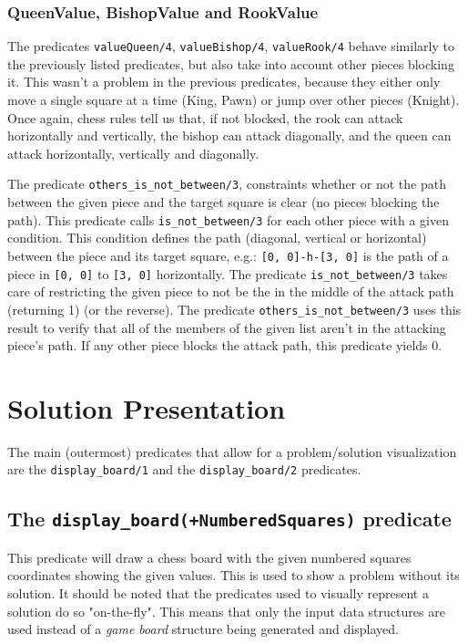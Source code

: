 \documentclass[runningheads]{llncs}
\newcommand{\inlinecode}[1]{\texttt{#1}}
\begin{document}
\subsubsection{QueenValue, BishopValue and RookValue}
The predicates \inlinecode{valueQueen/4}, \inlinecode{valueBishop/4}, \inlinecode{valueRook/4}
behave similarly to the previously listed predicates, but also take into account
other pieces blocking it. This wasn't a problem in the previous predicates, because
they either only move a single square at a time (King, Pawn) or jump over other pieces
(Knight). Once again, chess rules tell us that, if not blocked, the rook can attack
horizontally and vertically, the bishop can attack diagonally, and the queen can attack
horizontally, vertically and diagonally.

The predicate \inlinecode{others\_is\_not\_between/3}, constraints whether or not the
path between the given piece and the target square is clear (no pieces blocking the path).
This predicate calls \inlinecode{is\_not\_between/3} for each other piece with a given
condition. This condition defines the path (diagonal, vertical or horizontal) between
the piece and its target square, e.g.: \inlinecode{[0, 0]-h-[3, 0]} is the path of
a piece in \inlinecode{[0, 0]} to \inlinecode{[3, 0]} horizontally. The predicate
\inlinecode{is\_not\_between/3} takes care of restricting the given piece to not
be the in the middle of the attack path (returning 1) (or the reverse). The predicate
\inlinecode{others\_is\_not\_between/3} uses this result to verify that all of the
members of the given list aren't in the attacking piece's path. If any other piece
blocks the attack path, this predicate yields 0.

\section{Solution Presentation}

The main (outermost) predicates that allow for a problem/solution visualization
are the \inlinecode{display\_board/1} and the \inlinecode{display\_board/2} predicates.

\subsection{The \inlinecode{display\_board(+NumberedSquares)} predicate}

This predicate will draw a chess board with the given numbered squares coordinates
showing the given values. This is used to show a problem without its solution. It
should be noted that the predicates used to visually represent a solution do so
"on-the-fly". This means that only the input data structures are used instead of
a \textit{game board} structure being generated and displayed.
\end{document}
